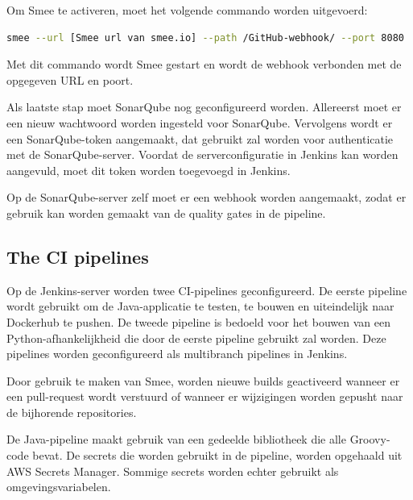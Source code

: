 Om Smee te activeren, moet het volgende commando worden uitgevoerd:
\newline

\begin{lstlisting}[language=bash, style=bashstyle]
  smee --url [Smee url van smee.io] --path /GitHub-webhook/ --port 8080
\end{lstlisting}

\vspace{0.5cm}
Met dit commando wordt Smee gestart en wordt de webhook verbonden met de opgegeven URL en poort.
\newline

Als laatste stap moet SonarQube nog geconfigureerd worden. Allereerst moet er een nieuw wachtwoord worden ingesteld voor SonarQube. Vervolgens wordt er een SonarQube-token aangemaakt, dat gebruikt zal worden voor authenticatie met de SonarQube-server. Voordat de serverconfiguratie in Jenkins kan worden aangevuld, moet dit token worden toegevoegd in Jenkins.
\newline

Op de SonarQube-server zelf moet er een webhook worden aangemaakt, zodat er gebruik kan worden gemaakt van de quality gates in de pipeline.

\subsection{
{The CI pipelines}}
\label{sec:De CI pipelines}

Op de Jenkins-server worden twee CI-pipelines geconfigureerd. De eerste pipeline wordt gebruikt om de Java-applicatie te testen, te bouwen en uiteindelijk naar Dockerhub te pushen. De tweede pipeline is bedoeld voor het bouwen van een Python-afhankelijkheid die door de eerste pipeline gebruikt zal worden. Deze pipelines worden geconfigureerd als multibranch pipelines in Jenkins.
\newline

Door gebruik te maken van Smee, worden nieuwe builds geactiveerd wanneer er een pull-request wordt verstuurd of wanneer er wijzigingen worden gepusht naar de bijhorende repositories.
\newline

De Java-pipeline maakt gebruik van een gedeelde bibliotheek die alle Groovy-code bevat. De secrets die worden gebruikt in de pipeline, worden opgehaald uit AWS Secrets Manager. Sommige secrets worden echter gebruikt als omgevingsvariabelen.
\newline

